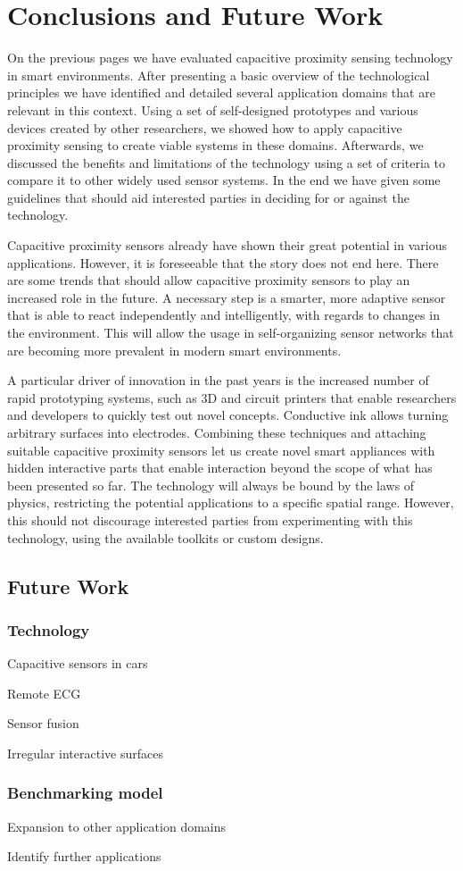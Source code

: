 \chapter{Conclusions and Future Work}
\label{ch:conclusion}

On the previous pages we have evaluated capacitive proximity sensing technology in smart environments. After presenting a basic overview of the technological principles we have identified and detailed several application domains that are relevant in this context. Using a set of self-designed prototypes and various devices created by other researchers, we showed how to apply capacitive proximity sensing to create viable systems in these domains. Afterwards, we discussed the benefits and limitations of the technology using a set of criteria to compare it to other widely used sensor systems. In the end we have given some guidelines that should aid interested parties in deciding for or against the technology.

Capacitive proximity sensors already have shown their great potential in various applications. However, it is foreseeable that the story does not end here. There are some trends that should allow capacitive proximity sensors to play an increased role in the future. A necessary step is a smarter, more adaptive sensor that is able to react independently and intelligently, with regards to changes in the environment. This will allow the usage in self-organizing sensor networks that are becoming more prevalent in modern smart environments.

A particular driver of innovation in the past years is the increased number of rapid prototyping systems, such as 3D and circuit printers that enable researchers and developers to quickly test out novel concepts. Conductive ink allows turning arbitrary surfaces into electrodes. Combining these techniques and attaching suitable capacitive proximity sensors let us create novel smart appliances with hidden interactive parts that enable interaction beyond the scope of what has been presented so far. 
The technology will always be bound by the laws of physics, restricting the potential applications to a specific spatial range. However, this should not discourage interested parties from experimenting with this technology, using the available toolkits or custom designs.

\section{Future Work}

\subsection{Technology}
Capacitive sensors in cars

Remote ECG

Sensor fusion

Irregular interactive surfaces

\subsection{Benchmarking model}
Expansion to other application domains

Identify further applications



